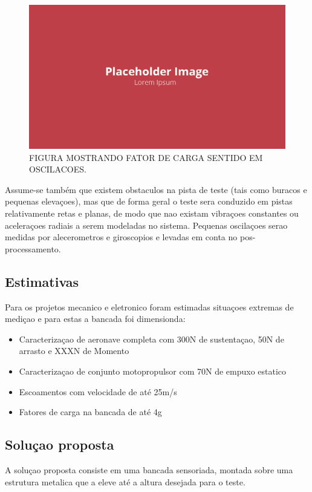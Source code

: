 \begin{figure}[!ht]
    \centering
    \includegraphics[width=.8\linewidth]{figuras/placeholder.png}
    \caption{FIGURA MOSTRANDO FATOR DE CARGA SENTIDO EM OSCILACOES\cite{autor}.}
    \label{fig:placeholder}
\end{figure}

Assume-se também que existem obstaculos na pista de teste (tais como buracos e pequenas elevaçoes), mas que de forma geral o teste sera conduzido em pistas relativamente retas e planas, de modo que nao existam vibraçoes constantes ou aceleraçoes radiais a serem modeladas no sistema. Pequenas oscilaçoes serao medidas por alecerometros e giroscopios e levadas em conta no pos-processamento.

\subsection{Estimativas}

Para os projetos mecanico e eletronico foram estimadas situaçoes extremas de mediçao e para estas a bancada foi dimensionda:

\begin{itemize}
    \item Caracterizaçao de aeronave completa com 300N de sustentaçao, 50N de arrasto e XXXN de Momento
    \item Caracterizaçao de conjunto motopropulsor com 70N de empuxo estatico
    \item Escoamentos com velocidade de até 25m/s
    \item Fatores de carga na bancada de até 4g
\end{itemize}

\subsection{Soluçao proposta}

A soluçao proposta consiste em uma bancada sensoriada, montada sobre uma estrutura metalica que a eleve até a altura desejada para o teste.


